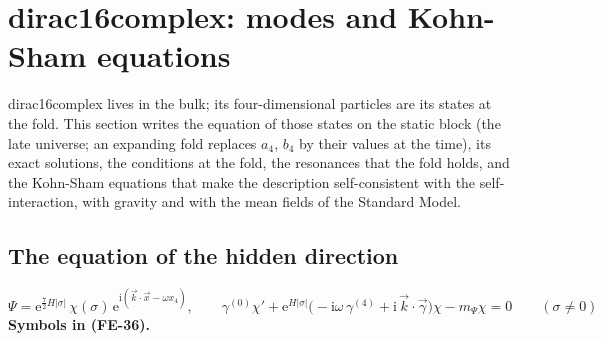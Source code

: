 \documentclass[
  10pt,
]{article}
\begin{document}
\hypertarget{dirac16complex-modes-and-kohn-sham-equations}{%
\section{dirac16complex: modes and Kohn-Sham
equations}\label{dirac16complex-modes-and-kohn-sham-equations}}

dirac16complex lives in the bulk; its four-dimensional particles are its
states at the fold. This section writes the equation of those states on
the static block (the late universe; an expanding fold replaces \(a_4\),
\(b_4\) by their values at the time), its exact solutions, the
conditions at the fold, the resonances that the fold holds, and the
Kohn-Sham equations that make the description self-consistent with the
self-interaction, with gravity and with the mean fields of the Standard
Model.

\hypertarget{the-equation-of-the-hidden-direction}{%
\subsection{The equation of the hidden
direction}\label{the-equation-of-the-hidden-direction}}

\[
\Psi = \mathrm{e}^{\frac72H\lvert\sigma\rvert}\,\chi(\sigma)\,\mathrm{e}^{\mathrm{i}(\vec k\cdot\vec x - \omega x_4)},\qquad
\gamma^{(0)}\chi' + \mathrm{e}^{H\lvert\sigma\rvert}\big(-\mathrm{i}\omega\,\gamma^{(4)} + \mathrm{i}\,\vec k\cdot\vec\gamma\big)\chi
 - m_\Psi\chi = 0\qquad(\sigma \ne 0) \tag{FE-36}
\] \textbf{Symbols in (FE-36).}
\end{document}
